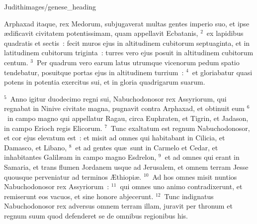 {Judith}{images/genese_heading}


\lettrine[lines=6,image=true,loversize=0.05,lraise=-0.03]{A}{}rphaxad itaque, rex Medorum, subjugaverat multas gentes imperio suo, et ipse \ae dificavit civitatem potentissimam, quam appellavit Ecbatanis,
${}^{2}$~ex lapidibus quadratis et sectis~: fecit muros ejus in altitudinem cubitorum septuaginta, et in latitudinem cubitorum triginta~: turres vero ejus posuit in altitudinem cubitorum centum.
${}^{3}$~Per quadrum vero earum latus utrumque vicenorum pedum spatio tendebatur, posuitque portas ejus in altitudinem turrium~:
${}^{4}$~et gloriabatur quasi potens in potentia exercitus sui, et in gloria quadrigarum suarum.


${}^{5}$~Anno igitur duodecimo regni sui, Nabuchodonosor rex Assyriorum, qui regnabat in Ninive civitate magna, pugnavit contra Arphaxad, et obtinuit eum
${}^{6}$~in campo magno qui appellatur Ragau, circa Euphraten, et Tigrin, et Jadason, in campo Erioch regis Elicorum.
${}^{7}$~Tunc exaltatum est regnum Nabuchodonosor, et cor ejus elevatum est~: et misit ad omnes qui habitabant in Cilicia, et Damasco, et Libano,
${}^{8}$~et ad gentes qu\ae\ sunt in Carmelo et Cedar, et inhabitantes Galil\ae am in campo magno Esdrelon,
${}^{9}$~et ad omnes qui erant in Samaria, et trans flumen Jordanem usque ad Jerusalem, et omnem terram Jesse quousque perveniatur ad terminos \AE thiopi\ae .
${}^{10}$~Ad hos omnes misit nuntios Nabuchodonosor rex Assyriorum~:
${}^{11}$~qui omnes uno animo contradixerunt, et remiserunt eos vacuos, et sine honore abjecerunt.
${}^{12}$~Tunc indignatus Nabuchodonosor rex adversus omnem terram illam, juravit per thronum et regnum suum quod defenderet se de omnibus regionibus his.

